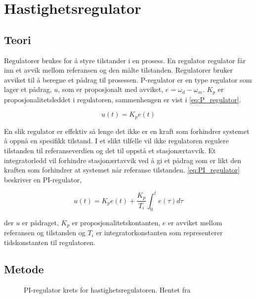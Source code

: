 \section{Hastighetsregulator}\label{sec:hastighetsreg}

\subsection{Teori}

Regulatorer brukes for å styre tilstander i en prosess. En regulator regulator får inn et avvik mellom referansen og den målte tilstanden. Regulatorer bruker avviket til å beregne et pådrag til prosessen. P-regulator er en type regulator som lager et pådrag, $u$,  som er proposjonalt med avviket, $e = \omega_d - \omega_m$. $K_p$ er proposjonalitetsleddet i regulatoren, sammenhengen er vist i \autoref{eq:P_regulator}.

\begin{equation}
    \label{eq:P_regulator}
    u(t) = K_p e(t)
\end{equation}

En slik regulator er effektiv så lenge det ikke er en kraft som forhindrer systemet å oppnå en spesifikk tilstand. I et slikt tilfelle vil ikke regulatoren regulere tilstanden til referanseverdien og det til oppstå et stasjonærtavvik. Et integratorledd vil forhindre stasjonærtavvik ved å gi et pådrag som er likt den kraften som forhindrer at systemet når referanse tilstanden. \autoref{eq:PI_regulator} beskriver en PI-regulator,

\begin{equation}
    \label{eq:PI_regulator}
    u(t) = K_p e(t) + \frac{K_p}{T_i} \int_{0}^{t} e(\tau) d\tau
\end{equation}

der $u$ er pådraget, $K_p$ er proposjonalitetskontanten, $e$ er avviket mellom referansen og tilstanden og $T_i$ er integratorkonstanten som representerer tidskonstanten til regulatoren.

\subsection{Metode}

\begin{figure}[b]
    \centering
    
    \caption{PI-regulator krets for hastighetsregulatoren. Hentet fra \cite{AnalogMotorlabbOppgaver}}
    \label{fig:krets_hastighets_regulator}
\end{figure}


